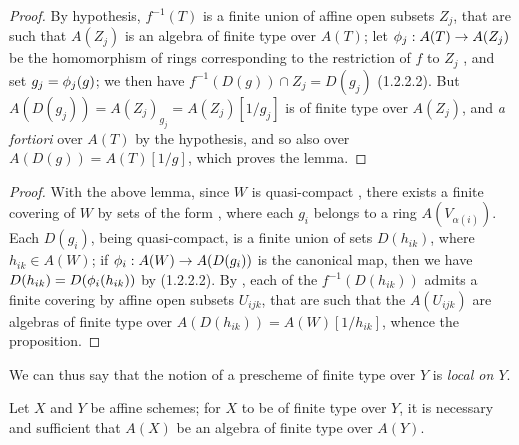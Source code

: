 \begin{proof}
\label{proof-1.6.3.2.1}
By hypothesis, $f^{-1}(T)$ is a finite union of affine open subsets $Z_j$, that are such that $A(Z_j)$ is an algebra of finite type over $A(T)$;
let $\vphi_j:A(T)\to A(Z_j)$ be the homomorphism of rings corresponding to the restriction of $f$ to $Z_j$ , and set $g_j=\phi_j(g)$;
we then have $f^{-1}(D(g))\cap Z_j=D(g_j)$ (1.2.2.2).
But $A(D(g_j))=A(Z_j)_{g_j}=A(Z_j)[1/g_j]$ is of finite type over $A(Z_j)$, and \emph{a fortiori} over $A(T)$ by the hypothesis, and so also over $A(D(g))=A(T)[1/g]$, which proves the lemma.
\end{proof}

\begin{proof}
\label{proof-1.6.3.2}
With the above lemma, since $W$ is quasi-compact , there exists a finite covering of $W$ by sets of the form , where each $g_i$ belongs to a ring $A(V_{\alpha(i)})$.
Each $D(g_i)$, being quasi-compact, is a finite union of sets $D(h_{ik})$, where $h_{ik}\in A(W)$;
if $\vphi_i:A(W)\to A(D(g_i))$ is the canonical map, then we have $D(h_{ik})=D(\phi_i(h_{ik}))$ by (1.2.2.2).
By , each of the $f^{-1}(D(h_{ik}))$ admits a finite covering by affine open subsets $U_{ijk}$, that are such that the $A(U_{ijk})$ are algebras of finite type over $A(D(h_{ik}))=A(W)[1/h_{ik}]$, whence the proposition.
\end{proof}

We
can thus say that the notion of a prescheme of finite type over $Y$ is \emph{local on $Y$}.

\begin{proposition}[6.3.3]
\label{I.6.3.3}
Let $X$ and $Y$ be affine schemes;
for $X$ to be of finite type over $Y$, it is necessary and sufficient that $A(X)$ be an algebra of finite type over $A(Y)$.
\end{proposition}


